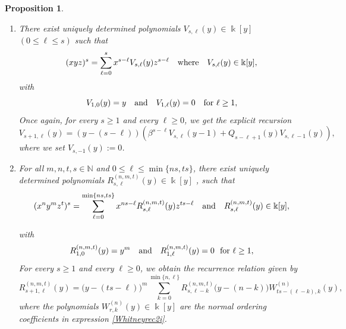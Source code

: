 \documentclass{amsart}
\newtheorem{proposition}[theorem]{Proposition}
\theoremstyle{definition}
\theoremstyle{remark}
\numberwithin{equation}{section}
\begin{document}
\begin{proposition}
\begin{enumerate}
\item [\rm (3)] There exist uniquely determined polynomials $V_{s,\ell}(y)\in\Bbbk[y]$ $(0\le \ell\le s)$ such that
\begin{equation}\label{Vdefxyz2i}
(xyz)^s = \sum_{\ell=0}^{s} x^{s-\ell}V_{s,\ell}(y)z^{s-\ell} \quad {\rm where}\quad V_{s,\ell}(y)\in\Bbbk[y],
\end{equation}
with
\[
V_{1,0}(y) = y \quad {\rm and} \quad V_{1,\ell}(y)=0 \quad \text{for}\, \,  \ell\ge 1,
\]
Once again, for every $s\ge 1$ and every $\ell\ge 0$, we get the explicit recursion
\begin{equation}\label{Vrecexplicit2i}
V_{s+1,\ell}(y) = (y-(s-\ell))\left(\beta^{s-\ell}V_{s,\ell}(y-1)+Q_{s-\ell+1}(y) V_{s,\ell-1}(y)\right),
\end{equation}
where we set $V_{s,-1}(y):=0$.

\item [\rm (4)] For all $m, n, t, s\in\mathbb{N}$ and $0\le \ell\le \min\{ns,ts\}$, there exist uniquely determined polynomials $R^{(n,m,t)}_{s,\ell}(y)\in\Bbbk[y]$ , such that
\begin{equation}\label{Rdefblock2i}
(x^n y^m z^t)^s = \sum_{\ell=0}^{\min\{ns,ts\}} x^{ns-\ell}R^{(n,m,t)}_{s,\ell}(y)z^{ts-\ell} \quad {\rm and} \quad R^{(n,m,t)}_{s,\ell}(y)\in\Bbbk[y],
\end{equation}

with
\[
R^{(n,m,t)}_{1,0}(y)=y^m \quad {\rm and} \quad R^{(n,m,t)}_{1,\ell}(y) = 0 \, \,  \text{ for} \, \, \ell\ge 1,
\]
For every $s\ge 1$ and every $\ell\ge 0$, we obtain the recurrence relation given by
\begin{equation}\label{Rrecexplicit2i}
R^{(n,m,t)}_{s+1,\ell}(y) = \big(y-(ts-\ell)\big)^{m}\sum_{k=0}^{\min\{n,\ell\}}R^{(n,m,t)}_{s,\ell-k}\big(y-(n-k)\big)W^{(n)}_{ts-(\ell-k),k}(y),
\end{equation}
where the polynomials $W^{(n)}_{r,k}(y)\in\Bbbk[y]$ are the normal ordering coefficients in expression \eqref{Whitneyrec2i}.


\end{enumerate}
\end{proposition}
\end{document}
